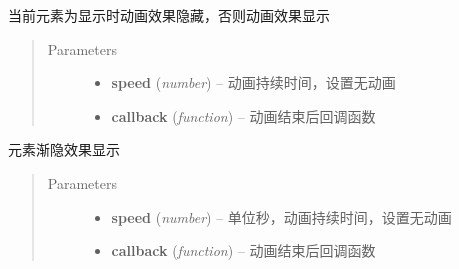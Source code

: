 \documentclass[letterpaper,10pt,english]{sphinxmanual}
\begin{document}

\begin{fulllineitems}
\label{api/core/anim/index:Anim.Node.toggle}
当前元素为显示时动画效果隐藏，否则动画效果显示
\begin{quote}\begin{description}
\item[{Parameters}] \leavevmode\begin{itemize}
\item {}
\textbf{speed} (\emph{number}) -- 动画持续时间，设置无动画

\item {}
\textbf{callback} (\emph{function}) -- 动画结束后回调函数

\end{itemize}

\end{description}\end{quote}

\end{fulllineitems}



\begin{fulllineitems}
\label{api/core/anim/index:Anim.Node.fadeIn}
元素渐隐效果显示
\begin{quote}\begin{description}
\item[{Parameters}] \leavevmode\begin{itemize}
\item {}
\textbf{speed} (\emph{number}) -- 单位秒，动画持续时间，设置无动画

\item {}
\textbf{callback} (\emph{function}) -- 动画结束后回调函数

\end{itemize}

\end{description}\end{quote}

\end{fulllineitems}


\end{document}
